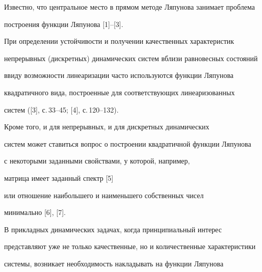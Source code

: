 \date{}




\pagestyle{plain} %







\maketitle


\label{begin}











Известно, что центральное место в прямом методе Ляпунова занимает проблема


построения функции Ляпунова [1]--[3].





При определении устойчивости и получении качественных характеристик


непрерывных (дискретных) динамических систем вблизи равновесных состояний


ввиду возможности линеаризации часто используются функции Ляпунова


квадратичного вида, построенные для соответствующих линеаризованных


систем ([3], с.\,33--45; [4], с.\,120--132).


Кроме того, и для непрерывных, и для дискретных динамических


систем может ставиться вопрос о построении квадратичной функции Ляпунова


с некоторыми заданными свойствами, у которой, например,


матрица  имеет заданный спектр [5]


или отношение наибольшего и наименьшего собственных чисел


минимально [6], [7].





В прикладных динамических задачах, когда принципиальный интерес


представляют уже не только качественные, но и количественные характеристики


системы, возникает необходимость накладывать на функции Ляпунова 


